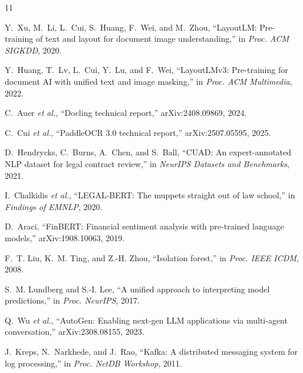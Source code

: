 \documentclass[12pt]{report}
\begin{document}





\begin{thebibliography}{11}

Y.~Xu, M.~Li, L.~Cui, S.~Huang, F.~Wei, and M.~Zhou, ``LayoutLM: Pre-training of text and layout for document image understanding,'' in \emph{Proc. ACM SIGKDD}, 2020.

Y.~Huang, T.~Lv, L.~Cui, Y.~Lu, and F.~Wei, ``LayoutLMv3: Pre-training for document AI with unified text and image masking,'' in \emph{Proc. ACM Multimedia}, 2022.

C.~Auer \emph{et al.}, ``Docling technical report,'' arXiv:2408.09869, 2024.

C.~Cui \emph{et al.}, ``PaddleOCR 3.0 technical report,'' arXiv:2507.05595, 2025.

D.~Hendrycks, C.~Burns, A.~Chen, and S.~Ball, ``CUAD: An expert-annotated NLP dataset for legal contract review,'' in \emph{NeurIPS Datasets and Benchmarks}, 2021.

I.~Chalkidis \emph{et al.}, ``LEGAL-BERT: The muppets straight out of law school,'' in \emph{Findings of EMNLP}, 2020.

D.~Araci, ``FinBERT: Financial sentiment analysis with pre-trained language models,'' arXiv:1908.10063, 2019.

F.~T. Liu, K.~M. Ting, and Z.-H. Zhou, ``Isolation forest,'' in \emph{Proc. IEEE ICDM}, 2008.

S.~M. Lundberg and S.-I. Lee, ``A unified approach to interpreting model predictions,'' in \emph{Proc. NeurIPS}, 2017.

Q.~Wu \emph{et al.}, ``AutoGen: Enabling next-gen LLM applications via multi-agent conversation,'' arXiv:2308.08155, 2023.

J.~Kreps, N.~Narkhede, and J.~Rao, ``Kafka: A distributed messaging system for log processing,'' in \emph{Proc. NetDB Workshop}, 2011.

\end{thebibliography}
\end{document}
